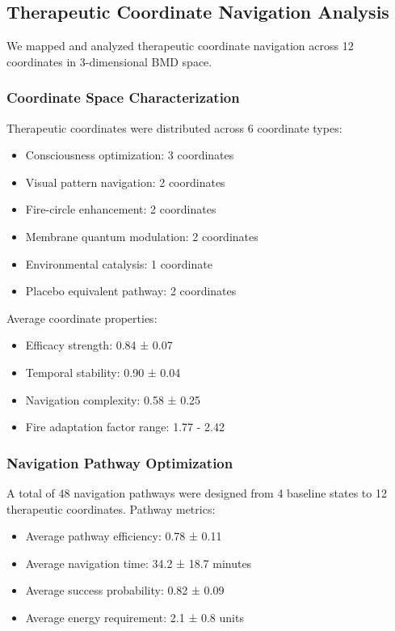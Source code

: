 \documentclass[12pt,a4paper]{article}
\begin{document}
\subsection{Therapeutic Coordinate Navigation Analysis}

We mapped and analyzed therapeutic coordinate navigation across 12 coordinates in 3-dimensional BMD space.

\subsubsection{Coordinate Space Characterization}

Therapeutic coordinates were distributed across 6 coordinate types:
\begin{itemize}
\item Consciousness optimization: 3 coordinates
\item Visual pattern navigation: 2 coordinates
\item Fire-circle enhancement: 2 coordinates
\item Membrane quantum modulation: 2 coordinates
\item Environmental catalysis: 1 coordinate
\item Placebo equivalent pathway: 2 coordinates
\end{itemize}

Average coordinate properties:
\begin{itemize}
\item Efficacy strength: 0.84 ± 0.07
\item Temporal stability: 0.90 ± 0.04
\item Navigation complexity: 0.58 ± 0.25
\item Fire adaptation factor range: 1.77 - 2.42
\end{itemize}

\subsubsection{Navigation Pathway Optimization}

A total of 48 navigation pathways were designed from 4 baseline states to 12 therapeutic coordinates. Pathway metrics:
\begin{itemize}
\item Average pathway efficiency: 0.78 ± 0.11
\item Average navigation time: 34.2 ± 18.7 minutes
\item Average success probability: 0.82 ± 0.09
\item Average energy requirement: 2.1 ± 0.8 units
\end{itemize}
\end{document}
